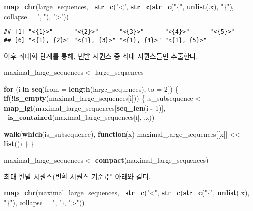 \documentclass[]{book}
\newenvironment{Shaded}{\begin{snugshade}}{\end{snugshade}}
\newcommand{\ControlFlowTok}[1]{\textcolor[rgb]{0.13,0.29,0.53}{\textbf{#1}}}
\newcommand{\DataTypeTok}[1]{\textcolor[rgb]{0.13,0.29,0.53}{#1}}
\newcommand{\DecValTok}[1]{\textcolor[rgb]{0.00,0.00,0.81}{#1}}
\newcommand{\KeywordTok}[1]{\textcolor[rgb]{0.13,0.29,0.53}{\textbf{#1}}}
\newcommand{\NormalTok}[1]{#1}
\newcommand{\OperatorTok}[1]{\textcolor[rgb]{0.81,0.36,0.00}{\textbf{#1}}}
\newcommand{\StringTok}[1]{\textcolor[rgb]{0.31,0.60,0.02}{#1}}
\begin{document}
\begin{Shaded}
\begin{Highlighting}[]
\KeywordTok{map_chr}\NormalTok{(large_sequences, }
    \OperatorTok{~}\KeywordTok{str_c}\NormalTok{(}\StringTok{"<"}\NormalTok{, }\KeywordTok{str_c}\NormalTok{(}\KeywordTok{str_c}\NormalTok{(}\StringTok{"\{"}\NormalTok{, }\KeywordTok{unlist}\NormalTok{(.x), }\StringTok{"\}"}\NormalTok{), }\DataTypeTok{collapse =} \StringTok{", "}\NormalTok{), }\StringTok{">"}\NormalTok{))}
\end{Highlighting}
\end{Shaded}

\begin{verbatim}
## [1] "<{1}>"      "<{2}>"      "<{3}>"      "<{4}>"      "<{5}>"     
## [6] "<{1}, {2}>" "<{1}, {3}>" "<{1}, {4}>" "<{1}, {5}>"
\end{verbatim}

이후 최대화 단계를 통해, 빈발 시퀀스 중 최대 시퀀스들만 추출한다.

\begin{Shaded}
\begin{Highlighting}[]
\NormalTok{maximal_large_sequences <-}\StringTok{ }\NormalTok{large_sequences}

\ControlFlowTok{for}\NormalTok{ (i }\ControlFlowTok{in} \KeywordTok{seq}\NormalTok{(}\DataTypeTok{from =} \KeywordTok{length}\NormalTok{(large_sequences), }\DataTypeTok{to =} \DecValTok{2}\NormalTok{)) \{}
  \ControlFlowTok{if}\NormalTok{(}\OperatorTok{!}\KeywordTok{is_empty}\NormalTok{(maximal_large_sequences[i])) \{}
\NormalTok{    is_subsequence <-}\StringTok{ }\KeywordTok{map_lgl}\NormalTok{(maximal_large_sequences[}\KeywordTok{seq_len}\NormalTok{(i }\OperatorTok{-}\StringTok{ }\DecValTok{1}\NormalTok{)],}
                              \OperatorTok{~}\KeywordTok{is_contained}\NormalTok{(maximal_large_sequences[i], .x))}
    
    \KeywordTok{walk}\NormalTok{(}\KeywordTok{which}\NormalTok{(is_subsequence), }\ControlFlowTok{function}\NormalTok{(x) maximal_large_sequences[[x]] <<-}\StringTok{ }\KeywordTok{list}\NormalTok{())}
\NormalTok{  \}}
\NormalTok{\}}

\NormalTok{maximal_large_sequences <-}\StringTok{ }\KeywordTok{compact}\NormalTok{(maximal_large_sequences)}
\end{Highlighting}
\end{Shaded}

최대 빈발 시퀀스(변환 시퀀스 기준)은 아래와 같다.

\begin{Shaded}
\begin{Highlighting}[]
\KeywordTok{map_chr}\NormalTok{(maximal_large_sequences, }
    \OperatorTok{~}\KeywordTok{str_c}\NormalTok{(}\StringTok{"<"}\NormalTok{, }\KeywordTok{str_c}\NormalTok{(}\KeywordTok{str_c}\NormalTok{(}\StringTok{"\{"}\NormalTok{, }\KeywordTok{unlist}\NormalTok{(.x), }\StringTok{"\}"}\NormalTok{), }\DataTypeTok{collapse =} \StringTok{", "}\NormalTok{), }\StringTok{">"}\NormalTok{))}
\end{Highlighting}
\end{Shaded}
\end{document}
